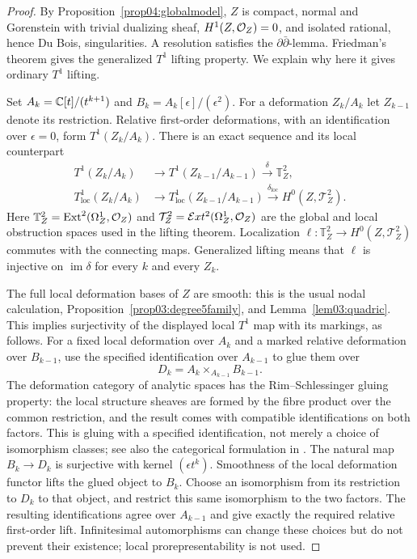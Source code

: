 \begin{proof}
By Proposition~\ref{prop04:globalmodel}, $Z$ is compact, normal and
Gorenstein with trivial dualizing sheaf, $H^1(Z,\mathcal{O}_Z)=0$, and isolated
rational, hence Du Bois, singularities.  A resolution satisfies the
$\partial\bar\partial$-lemma.  Friedman's theorem
\cite[Theorem~3.10]{friedman2026} gives the generalized $T^1$ lifting
property.  We explain why here it gives ordinary $T^1$ lifting.

Set $A_k=\mathbb{C}[t]/(t^{k+1})$ and
$B_k=A_k[\epsilon]/(\epsilon^2)$.  For a deformation $Z_k/A_k$ let
$Z_{k-1}$ denote its restriction.  Relative first-order deformations,
with an identification over $\epsilon=0$, form $T^1(Z_k/A_k)$.
There is an exact sequence and its local counterpart
\[
 \begin{aligned}
 T^1(Z_k/A_k)&\longrightarrow T^1(Z_{k-1}/A_{k-1})
       \xrightarrow{\delta}\mathbb T^2_Z,\\
 T^1_{\mathrm{loc}}(Z_k/A_k)&\longrightarrow
 T^1_{\mathrm{loc}}(Z_{k-1}/A_{k-1})
       \xrightarrow{\delta_{\mathrm{loc}}}
       H^0(Z,\mathcal T^2_Z).
 \end{aligned}
\]
Here $\mathbb T^2_Z=\operatorname{Ext}^2(\Omega^1_Z,\mathcal{O}_Z)$ and
$\mathcal T^2_Z=\mathcal{E}xt^2(\Omega^1_Z,\mathcal{O}_Z)$ are the global
and local obstruction spaces used in the lifting theorem.
Localization $\ell:\mathbb T^2_Z\to H^0(Z,\mathcal T^2_Z)$
commutes with the connecting maps.  Generalized lifting means that
$\ell$ is injective on $\operatorname{im}\delta$ for every $k$ and
every $Z_k$.

The full local deformation bases of $Z$ are smooth: this is the usual
nodal calculation, Proposition~\ref{prop03:degree5family}, and
Lemma~\ref{lem03:quadric}.  This implies
surjectivity of the displayed local $T^1$ map with its markings, as
follows.  For a fixed local deformation over $A_k$ and a marked relative
deformation over $B_{k-1}$, use the specified identification over
$A_{k-1}$ to glue them over
\[
 D_k=A_k\times_{A_{k-1}}B_{k-1}.
\]
The deformation category of analytic spaces has the
Rim--Schlessinger gluing property: the local structure sheaves are
formed by the fibre product over the common restriction, and the
result comes with compatible identifications on both factors.  This
is gluing with a specified identification, not merely a choice of
isomorphism classes; see also the categorical formulation in
\cite[\S1]{Gross97rev}.  The natural map
$B_k\to D_k$ is surjective with kernel $(\epsilon t^k)$.
Smoothness of the local deformation functor lifts the glued object to
$B_k$.  Choose an isomorphism from its restriction to $D_k$ to that
object, and restrict this same isomorphism to the two factors.
The resulting identifications agree over $A_{k-1}$ and give exactly
the required relative first-order lift.  Infinitesimal automorphisms
can change these choices but do not prevent their existence; local
prorepresentability is not used.


\end{proof}
